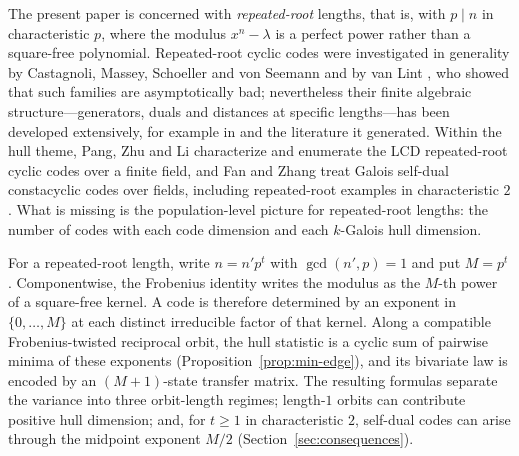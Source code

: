 \documentclass[11pt,a4paper]{article}
\numberwithin{equation}{section}
\theoremstyle{plain}
\theoremstyle{definition}
\theoremstyle{remark}
\begin{document}
The present paper is concerned with \emph{repeated-root} lengths, that is,
with $p\mid n$ in characteristic $p$, where the modulus $x^n-\lambda$ is a
perfect power rather than a square-free polynomial. Repeated-root cyclic
codes were investigated in generality by Castagnoli, Massey, Schoeller and
von Seemann \cite{castagnoli1991} and by van Lint \cite{vanLint1991}, who
showed that such families are asymptotically bad; nevertheless their finite
algebraic structure---generators, duals and distances at specific
lengths---has been developed extensively, for example in
\cite{dinh2012} and the literature it generated. Within the hull theme,
Pang, Zhu and Li \cite{pangZhuLi2018} characterize and enumerate the LCD
repeated-root cyclic codes over a finite field, and Fan and Zhang
\cite{fanZhang2017} treat Galois self-dual constacyclic codes over fields,
including repeated-root examples in characteristic $2$. What is missing is
the population-level picture for repeated-root lengths: the number of codes
with each code dimension and each $k$-Galois hull dimension.

For a repeated-root length, write $n=n'p^t$ with $\gcd(n',p)=1$ and put
$M=p^t$. Componentwise, the Frobenius identity writes the modulus as the
$M$-th power of a square-free kernel. A code is therefore determined by an
exponent in $\{0,\dots,M\}$ at each distinct irreducible factor of that
kernel. Along a compatible Frobenius-twisted reciprocal orbit, the hull
statistic is a cyclic sum of pairwise minima of these exponents
(Proposition~\ref{prop:min-edge}), and its bivariate law is encoded by an
$(M+1)$-state transfer matrix. The resulting formulas separate the variance
into three orbit-length regimes; length-$1$ orbits can contribute positive
hull dimension; and, for $t\geq1$ in characteristic $2$, self-dual codes can
arise through the midpoint exponent $M/2$
(Section~\ref{sec:consequences}).
\end{document}
